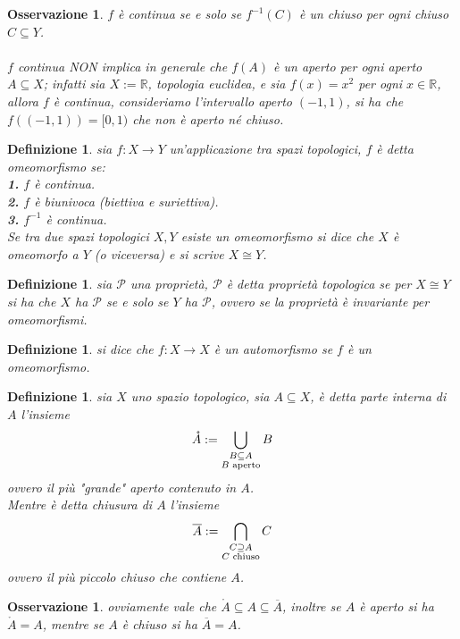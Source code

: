 \documentclass[oneside, 11pt]{amsbook}
\newcommand{\0}{{(0)}}
\newcommand{\3}{{(3)}}
\theoremstyle{colonplain}
\theoremstyle{colondefinition}
\newtheorem{defn}[thm]{Definizione}
\theoremstyle{colonremark}
\newtheorem{rmk}[thm]{Osservazione}
\numberwithin{equation}{chapter}
\begin{document}
\begin{rmk} $f$ è continua se e solo se $f^{-1}(C)$ è un chiuso per ogni chiuso $C \subseteq Y$. \\ \\
$f$ continua NON implica in generale che $f(A)$ è un aperto per ogni aperto $A \subseteq X$; infatti sia $X := \mathbb{R}$, topologia euclidea, e sia $f(x) = x^2$ per ogni $x \in \mathbb{R}$, allora $f$ è continua, consideriamo l'intervallo aperto $(-1, 1)$, si ha che $f((-1, 1)) = [0, 1)$ che non è aperto né chiuso.
\end{rmk}
\begin{defn} sia $f : X \longrightarrow Y$ un'applicazione tra spazi topologici, $f$ è detta \textit{omeomorfismo} se: \\
\textbf{1.} $f$ è continua. \\
\textbf{2.} $f$ è biunivoca (biettiva e suriettiva). \\
\textbf{3.} $f^{-1}$ è continua. \\
Se tra due spazi topologici $X, Y$ esiste un omeomorfismo si dice che $X$ è omeomorfo a $Y$ (o viceversa) e si scrive $X \cong Y$.
\end{defn}
\begin{defn}
sia $\mathcal{P}$ una proprietà, $\mathcal{P}$ è detta \textit{proprietà topologica} se per $X \cong Y$ si ha che $X$ ha $\mathcal{P}$ se e solo se $Y$ ha $\mathcal{P}$, ovvero se la proprietà è invariante per omeomorfismi.
\end{defn}
\begin{defn}
si dice che $f : X \longrightarrow X$ è un \textit{automorfismo} se $f$ è un omeomorfismo.
\end{defn}
\begin{defn}
sia $X$ uno spazio topologico, sia $A \subseteq X$, è detta \textit{parte interna di $A$} l'insieme
\begin{align}
    \mathring{A} := \bigcup_{\substack{B \subseteq A \\ B \text{ aperto}}} B \notag
\end{align}
ovvero il più "grande" aperto contenuto in $A$. \\
Mentre è detta \textit{chiusura di $A$} l'insieme
\begin{align}
    \overline{A} := \bigcap_{\substack{C \supseteq A \\ C \text{ chiuso}}} C \notag
\end{align}
ovvero il più piccolo chiuso che contiene $A$.
\end{defn}
\begin{rmk}
ovviamente vale che $\mathring{A} \subseteq A \subseteq \overline{A}$, inoltre se $A$ è aperto si ha $\mathring{A} = A$, mentre se $A$ è chiuso si ha $\overline{A} = A$.
\end{rmk}
\end{document}
